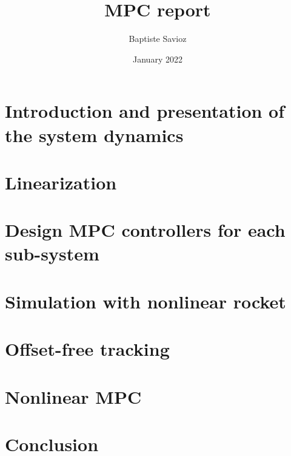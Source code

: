 \documentclass{article}
\title{MPC report}
\author{Baptiste Savioz }
\date{January 2022}
\begin{document}
\label{page:titre}


\newpage
\tableofcontents
\newpage


\section{Introduction and presentation of the system dynamics}
\label{sec:dynamics}


\section{Linearization}
\label{sec:lineraization}


\section{Design MPC controllers for each sub-system}
\label{sec:controller}


\section{Simulation with nonlinear rocket}
\label{sec:simulation}


\section{Offset-free tracking}
\label{sec:tracking}


\section{Nonlinear MPC}
\label{sec:nonlinearsec}


\section{Conclusion}
\label{sec:cocnlcusion}



\newpage
\printbibliography 
\end{document}

